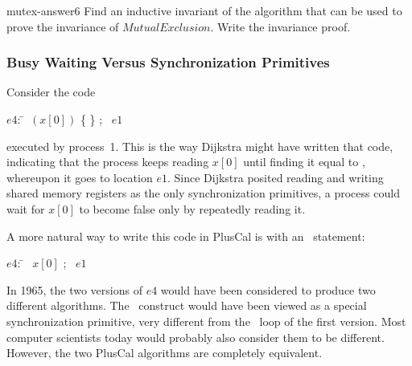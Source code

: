 \documentclass[fleqn,leqno]{article}
\begin{document}
\begin{aproblem}{mutex-answer6} \label{mutex-answer6}
 Find an inductive invariant of the algorithm that can be used to
prove the invariance of ${MutualExclusion}$.  Write the invariance proof.
\end{aproblem}

\subsubsection{Busy Waiting Versus Synchronization Primitives}

Consider the code
\begin{display}
\begin{tabbing}
$e4$: \= \pwhile\ $(x[0])$ \{ \pskip \} ; 
      \> \goto\ $e1$ 
\end{tabbing}
\end{display}
executed by process~1.  This is the way Dijkstra might have written
that code, indicating that the process keeps reading $x[0]$ until
finding it equal to \FALSE, whereupon it goes to location $e1$.
Since Dijkstra posited reading and writing shared memory registers as
the only synchronization primitives, a process could wait for $x[0]$
to become false only by repeatedly reading it.

A more natural way to write this code in PlusCal is with an 
\await\
statement:
\begin{display}
\begin{tabbing}
$e4$: \= \await\ $~x[0]$ ; 
      \> \goto\ $e1$ 
\end{tabbing}
\end{display}
In 1965, the two versions of $e4$ would have been considered to
produce two different algorithms.  The \await\ construct would have
been viewed as a special synchronization primitive, very different
from the \pwhile\ loop of the first version.  Most computer scientists
today would probably also consider them to be different.  However, the
two PlusCal algorithms are completely equivalent.
\end{document}
